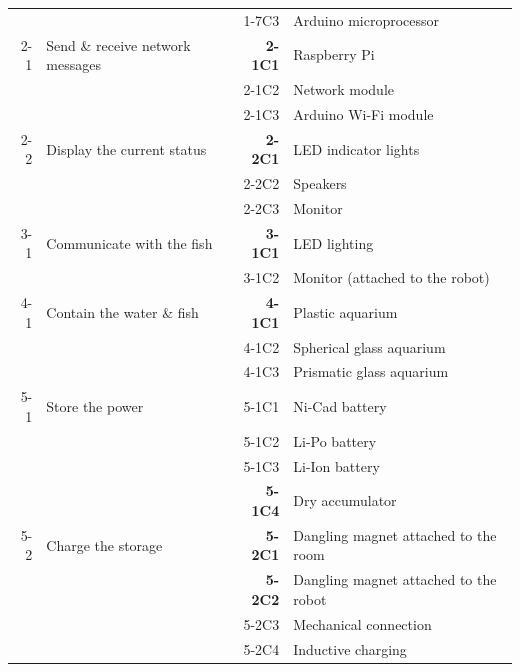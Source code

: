 \documentclass[a4paper, 10pt, DIV=16, parskip = full, twocolumn = true]{scrartcl}
\begin{document}
\begin{table}
\begin{tabular}{rlrl}
		& & 1-7C3 & Arduino microprocessor \\	
		2-1 & Send \& receive network messages & \textbf{2-1C1} & Raspberry Pi \\
		& & 2-1C2 & Network module \\	
		& & 2-1C3 & Arduino Wi-Fi module \\
		2-2 & Display the current status & \textbf{2-2C1} & LED indicator lights\\
		& & 2-2C2 & Speakers \\	
		& & 2-2C3 & Monitor \\	
		3-1 & Communicate with the fish & \textbf{3-1C1} & LED lighting \\
		& & 3-1C2 & Monitor (attached to the robot) \\		
		4-1 & Contain the water \& fish & \textbf{4-1C1} & Plastic aquarium \\
		& & 4-1C2 & Spherical glass aquarium \\	
		& & 4-1C3 & Prismatic glass aquarium \\
		5-1 & Store the power & 5-1C1 & Ni-Cad battery \\
		& & 5-1C2 & Li-Po battery \\	
		& & 5-1C3 & Li-Ion battery \\
		& & \textbf{5-1C4} & Dry accumulator \\	
		5-2 & Charge the storage & \textbf{5-2C1} & Dangling magnet attached to the room \\
		& & \textbf{5-2C2} & Dangling magnet attached to the robot \\	
		& & 5-2C3 & Mechanical connection \\
		& & 5-2C4 & Inductive charging \\
	\bottomrule
	\end{tabular}
\label{table:concepts}
\end{table}
\end{document}
